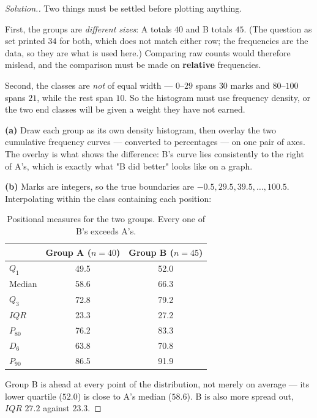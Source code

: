 \documentclass[11pt,a4paper]{article}
\theoremstyle{definition}
\newenvironment{solution}
  {\renewcommand{\qedsymbol}{}\begin{proof}[\textit{Solution}.]}
  {\end{proof}}
\begin{document}
\begin{solution}
Two things must be settled before plotting anything.

First, the groups are \emph{different sizes}: A totals $40$ and B totals $45$. (The question
as set printed $34$ for both, which does not match either row; the frequencies are the data,
so they are what is used here.) Comparing raw counts would therefore mislead, and the
comparison must be made on \textbf{relative} frequencies.

Second, the classes are \emph{not} of equal width --- $0$--$29$ spans $30$ marks and
$80$--$100$ spans $21$, while the rest span $10$. So the histogram must use frequency
density, or the two end classes will be given a weight they have not earned.

\textbf{(a)} Draw each group as its own density histogram, then overlay the two cumulative
frequency curves --- converted to percentages --- on one pair of axes. The overlay is what
shows the difference: B's curve lies consistently to the right of A's, which is exactly what
"B did better" looks like on a graph.

\textbf{(b)} Marks are integers, so the true boundaries are $-0.5, 29.5, 39.5, \ldots, 100.5$.
Interpolating within the class containing each position:
\begin{table}[H]
\centering
\begin{tabular}{|l|c|c|}
\hline
 & Group A ($n=40$) & Group B ($n=45$)\\
\hline
$Q_1$    & 49.5 & 52.0\\
Median   & 58.6 & 66.3\\
$Q_3$    & 72.8 & 79.2\\
$IQR$    & 23.3 & 27.2\\
$P_{80}$ & 76.2 & 83.3\\
$D_6$    & 63.8 & 70.8\\
$P_{90}$ & 86.5 & 91.9\\
\hline
\end{tabular}
\caption{Positional measures for the two groups. Every one of B's exceeds A's.}
\end{table}
Group B is ahead at every point of the distribution, not merely on average --- its lower
quartile ($52.0$) is close to A's median ($58.6$). B is also more spread out, $IQR$ $27.2$
against $23.3$.
\end{solution}
\end{document}
